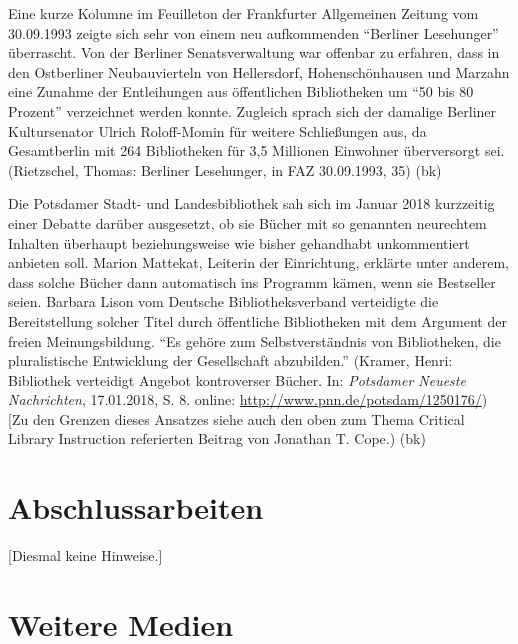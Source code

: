 \documentclass[a4paper,
fontsize=11pt,
oneside,
numbers=noperiodatend,
parskip=half-,
bibliography=totoc,
final
]{scrartcl}
\begin{document}
Eine kurze Kolumne im Feuilleton der Frankfurter Allgemeinen Zeitung vom
30.09.1993 zeigte sich sehr von einem neu aufkommenden \enquote{Berliner
Lesehunger} überrascht. Von der Berliner Senatsverwaltung war offenbar
zu erfahren, dass in den Ostberliner Neubauvierteln von Hellersdorf,
Hohenschönhausen und Marzahn eine Zunahme der Entleihungen aus
öffentlichen Bibliotheken um \enquote{50 bis 80 Prozent} verzeichnet
werden konnte. Zugleich sprach sich der damalige Berliner Kultursenator
Ulrich Roloff-Momin für weitere Schließungen aus, da Gesamtberlin mit
264 Bibliotheken für 3,5 Millionen Einwohner überversorgt sei.
(Rietzschel, Thomas: Berliner Lesehunger, in FAZ 30.09.1993, 35) (bk)

Die Potsdamer Stadt- und Landesbibliothek sah sich im Januar 2018
kurzzeitig einer Debatte darüber ausgesetzt, ob sie Bücher mit so
genannten neurechtem Inhalten überhaupt beziehungsweise wie bisher
gehandhabt unkommentiert anbieten soll. Marion Mattekat, Leiterin der
Einrichtung, erklärte unter anderem, dass solche Bücher dann automatisch
ins Programm kämen, wenn sie Bestseller seien. Barbara Lison vom
Deutsche Bibliotheksverband verteidigte die Bereitstellung solcher Titel
durch öffentliche Bibliotheken mit dem Argument der freien
Meinungsbildung. \enquote{Es gehöre zum Selbstverständnis von
Bibliotheken, die pluralistische Entwicklung der Gesellschaft
abzubilden.} (Kramer, Henri: Bibliothek verteidigt Angebot kontroverser
Bücher. In: \emph{Potsdamer Neueste Nachrichten}, 17.01.2018, S. 8.
online: \url{http://www.pnn.de/potsdam/1250176/}) {[}Zu den Grenzen
dieses Ansatzes siehe auch den oben zum Thema Critical Library
Instruction referierten Beitrag von Jonathan T. Cope.) (bk)

\hypertarget{abschlussarbeiten}{%
\section{Abschlussarbeiten}\label{abschlussarbeiten}}

{[}Diesmal keine Hinweise.{]}

\hypertarget{weitere-medien}{%
\section{Weitere Medien}\label{weitere-medien}}
\end{document}
